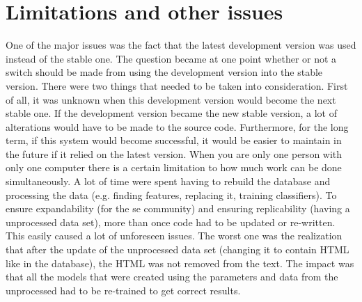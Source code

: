 \begin{comment}
Potentially move "all this failed and went wrong" here



discussion on the code that was written and its functionality \\
what worked, what should be updated/changed, etc.
\end{comment}

\clearpage
\section{Limitations and other issues}
\label{sec:limitations_and_issues}
One of the major issues was the fact that the latest development version was used instead of the stable one.
The question became at one point whether or not a switch should be made from using the development version into the stable version.
There were two things that needed to be taken into consideration. 
First of all, it was unknown when this development version would become the next stable one.
If the development version became the new stable version, a lot of alterations would have to be made to the source code.
Furthermore, for the long term, if this system would become successful, it would be easier to maintain in the future if it relied on the latest version.
\vspace{0.5em}\newline
{}
When you are only one person with only one computer there is a certain limitation to how much work can be done simultaneously.
A lot of time were spent having to rebuild the database and processing the data (e.g. finding features, replacing it, training classifiers).
To ensure expandability (for the \gls{se} community) and ensuring replicability (having a unprocessed data set), more than once code had to be updated or re-written. 
This easily caused a lot of unforeseen issues.
The worst one was the realization that after the update of the unprocessed data set (changing it to contain HTML like in the database), the HTML was not removed from the text.
The impact was that all the models that were created using the parameters and data from the unprocessed had to be re-trained to get correct results. 
\vspace{0.5em}\newline
